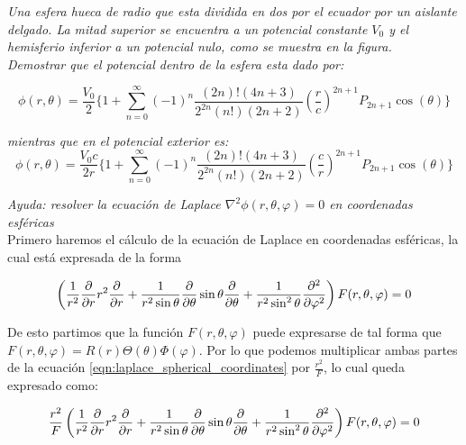 \documentclass[11pt]{report}
\theoremstyle{plain}
\theoremstyle{definition}
\begin{document}

\textit{Una esfera hueca de radio que esta dividida en dos por el ecuador por un aislante delgado. La mitad superior se encuentra a un potencial constante $V_0$ y el hemisferio inferior a un potencial nulo, como se muestra en la figura.}\\

\textit{Demostrar que el potencial dentro de la esfera esta dado por:}

\begin{equation}
	\phi(r, \theta) = \frac{V_0}{2}\{ 1 +\sum^\infty_{n=0}(-1)^n \frac{(2n)!(4n+3)}{2^{2n}(n!)(2n+2)}\left(\frac{r}{c}\right)^{2n+1}P_{2n+1}\cos(\theta)\}
\end{equation}

\textit{mientras que en el potencial exterior es:}
\begin{equation}
	\phi(r, \theta) = \frac{V_0c}{2r}\{ 1 +\sum^\infty_{n=0}(-1)^n \frac{(2n)!(4n+3)}{2^{2n}(n!)(2n+2)}\left(\frac{c}{r}\right)^{2n+1}P_{2n+1}\cos(\theta)\}
\end{equation}


\textit{Ayuda: resolver la ecuación de Laplace $\nabla^2 \phi(r,\theta,\varphi) =0$ en coordenadas esféricas}\\



Primero haremos el cálculo de la ecuación de Laplace en coordenadas esféricas, la cual está expresada de la forma

\begin{equation} %
\label{eqn:laplace_spherical_coordinates}
	\left(\frac{1}{r^2}\pdv{r}r^2\pdv{r} + \frac{1}{r^2\sin\theta}\pdv{\theta}\sin\theta\pdv{\theta} + \frac{1}{r^2\sin^2\theta}\pdv[2]{\varphi}\right)F(r,\theta,\varphi) = 0
\end{equation}


De esto partimos que la función $F(r,\theta,\varphi)$ puede expresarse de tal forma que $F(r,\theta,\varphi)=R(r)\Theta(\theta)\Phi(\varphi)$. Por lo que podemos multiplicar ambas partes de la ecuación \ref{eqn:laplace_spherical_coordinates} por $\frac{r^2}{F}$, lo cual queda expresado como:

\begin{equation*} %
	\frac{r^2}{F} \left(\frac{1}{r^2}\pdv{r}r^2\pdv{r} + \frac{1}{r^2\sin\theta}\pdv{\theta}\sin\theta\pdv{\theta} + \frac{1}{r^2\sin^2\theta}\pdv[2]{\varphi}\right)F(r,\theta,\varphi) = 0
\end{equation*}
\end{document}

